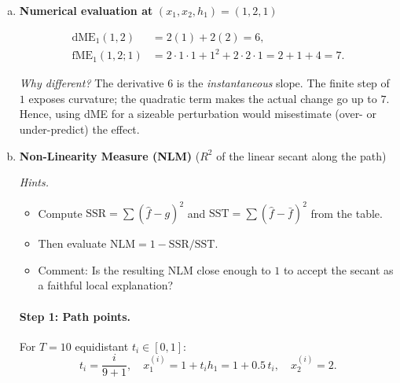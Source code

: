{\begin{enumerate}[a)]


\item \textbf{Numerical evaluation at} \((x_1,x_2,h_1)=(1,2,1)\)

\[
\begin{aligned}
  \text{dME}_1(1,2) &= 2(1)+2(2)=6,\\[0.2em]
  \text{fME}_1(1,2;1) &= 2 \cdot 1 \cdot 1 + 1^2 + 2 \cdot 2 \cdot 1 =2+1+4=7.
\end{aligned}
\]

\emph{Why different?}  
The derivative \(6\) is the \emph{instantaneous} slope.  
The finite step of \(1\) exposes curvature; the quadratic term makes the actual change go up to \(7\).  
Hence, using dME for a sizeable perturbation would misestimate (over- or under-predict) the effect.

\item \textbf{Non-Linearity Measure (NLM)}  
(\(R^2\) of the linear secant along the path)

\textit{Hints.}
\begin{itemize}\setlength\itemsep{0.2em}
  \item Compute $\text{SSR}=\sum(\hat f - g)^2$ and
        $\text{SST}=\sum(\hat f -\bar f)^2$ from the table.
  \item Then evaluate $\mathrm{NLM}=1-\mathrm{SSR}/\mathrm{SST}$.
  \item Comment: Is the resulting NLM close enough to $1$ to accept the
        secant as a faithful local explanation?
\end{itemize}

\paragraph{Step 1: Path points.}  
For \(T=10\) equidistant \(t_i\in[0,1]\):
\[
  t_i=\frac{i}{9+1}, \quad
  x_1^{(i)} = 1 + t_i h_1 = 1+0.5\,t_i, \quad
  x_2^{(i)} = 2.
\]


\end{enumerate}}
